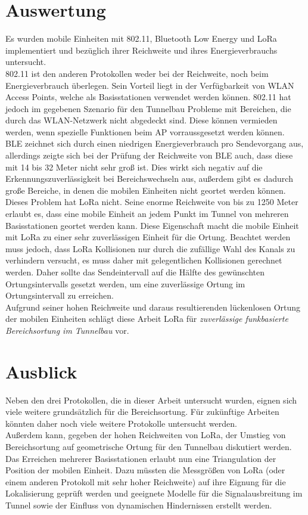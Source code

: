 \section{Auswertung}
Es wurden mobile Einheiten mit 802.11, Bluetooth Low Energy und LoRa implementiert und bezüglich ihrer Reichweite und ihres Energieverbrauchs untersucht.\\
802.11 ist den anderen Protokollen weder bei der Reichweite, noch beim Energieverbrauch überlegen. 
Sein Vorteil liegt in der Verfügbarkeit von WLAN Access Points, welche als Basisstationen verwendet werden können.
802.11 hat jedoch im gegebenen Szenario für den Tunnelbau Probleme mit Bereichen, die durch das WLAN-Netzwerk nicht abgedeckt sind. 
Diese können vermieden werden, wenn spezielle Funktionen beim AP vorraussgesetzt werden können.\\
BLE zeichnet sich durch einen niedrigen Energieverbrauch pro Sendevorgang aus, allerdings zeigte sich bei der Prüfung der Reichweite von BLE auch, dass diese mit 14 bis 32 Meter nicht sehr groß ist.
Dies wirkt sich negativ auf die Erkennungszuverlässigkeit bei Bereichswechseln aus, außerdem gibt es dadurch große Bereiche, in denen die mobilen Einheiten nicht geortet werden können.\\
Dieses Problem hat LoRa nicht. 
Seine enorme Reichweite von bis zu 1250 Meter erlaubt es, dass eine mobile Einheit an jedem Punkt im Tunnel von mehreren Basisstationen geortet werden kann.
Diese Eigenschaft macht die mobile Einheit mit LoRa zu einer sehr zuverlässigen Einheit für die Ortung.
Beachtet werden muss jedoch, dass LoRa Kollisionen nur durch die zufällige Wahl des Kanals zu verhindern versucht, es muss daher mit gelegentlichen Kollisionen gerechnet werden.
Daher sollte das Sendeintervall auf die Hälfte des gewünschten Ortungsintervalls gesetzt werden, um eine zuverlässige Ortung im Ortungsintervall zu erreichen.\\
Aufgrund seiner hohen Reichweite und daraus resultierenden lückenlosen Ortung der mobilen Einheiten schlägt diese Arbeit LoRa für \emph{zuverlässige funkbasierte Bereichsortung im Tunnelbau} vor.

\section{Ausblick}
Neben den drei Protokollen, die in dieser Arbeit untersucht wurden, eignen sich viele weitere grundsätzlich für die Bereichsortung.
Für zukünftige Arbeiten könnten daher noch viele weitere Protokolle untersucht werden. \\
Außerdem kann, gegeben der hohen Reichweiten von LoRa, der Umstieg von Bereichsortung auf geometrische Ortung für den Tunnelbau diskutiert werden. 
Das Erreichen mehrerer Basisstationen erlaubt nun eine Triangulation der Position der mobilen Einheit.
Dazu müssten die Messgrößen von LoRa (oder einem anderen Protokoll mit sehr hoher Reichweite) auf ihre Eignung für die Lokalisierung geprüft werden und geeignete Modelle für die Signalausbreitung im Tunnel sowie der Einfluss von dynamischen Hindernissen erstellt werden.

